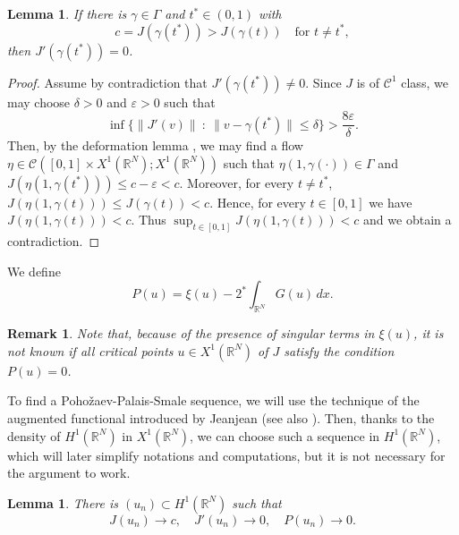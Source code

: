 \documentclass[12pt,leqno,twoside,sort]{amsart}
\newtheorem{Lem}[Th]{Lemma}
\newtheorem{Rem}[Th]{Remark}
\newcommand{\R}{\mathbb{R}}
\newcommand{\cC}{{\mathcal C}}
\numberwithin{equation}{section}
\begin{document}
\begin{Lem}\label{lemma:critical_point_on_path}
If there is $\gamma \in \Gamma$ and $t^*  \in (0,1)$ with 
$$
c = J(\gamma(t^*)) > J(\gamma(t)) \quad \mbox{for } t \neq t^*,
$$
then $J'(\gamma(t^*)) = 0$.
\end{Lem}

\begin{proof}
Assume by contradiction that $J'(\gamma(t^*)) \neq 0$. Since $J$ is of $\cC^1$ class, we may choose $\delta > 0$ and $\varepsilon > 0$ such that
$$
\inf \{ \| J'(v) \| \ : \ \|v - \gamma(t^*)\| \leq \delta \} > \frac{8\varepsilon}{\delta}.
$$
Then, by the deformation lemma \cite[Lemma 2.3]{W}, we may find a flow $\eta \in \cC ([0,1] \times X^1 (\R^N); X^1 (\R^N))$ such that $\eta(1, \gamma(\cdot)) \in \Gamma$ and $J(\eta(1,\gamma(t^*))) \leq c - \varepsilon < c$. Moreover, for every $t \neq t^*$, $J(\eta(1,\gamma(t))) \leq J(\gamma(t)) < c$. Hence, for every $t \in [0,1]$ we have $J(\eta(1,\gamma(t))) < c$. Thus $\sup_{t \in [0,1]} J(\eta(1,\gamma(t))) < c$ and we obtain a contradiction.
\end{proof}
We define
\[
    P(u) 
    = \xi(u) - 2^* \int_{\R^N} G(u) \, dx.
    \]

\begin{Rem}
    Note that, because of the presence of singular terms in $\xi(u)$, it is not known if all critical points $u\in X^1(\R^N)$ of $J$ satisfy the condition $P(u)=0$.
\end{Rem}




To find a Poho\v{z}aev-Palais-Smale sequence, we will use the technique of the augmented functional introduced by Jeanjean \cite{Jeanjean} (see also \cite{HirataIkomaTanaka, JeanjeanTanaka}). Then, thanks to the density of $H^1 (\R^N)$ in $X^1(\R^N)$, we can choose such a sequence in $H^1(\R^N)$, which will later simplify notations and computations, but it is not necessary for the argument to work.


\begin{Lem}\label{Lem:ExistencePPS}
There is $(u_n) \subset H^1 (\R^N)$ such that
$$
J(u_n) \to c, \quad J'(u_n) \to 0, \quad P(u_n) \to 0.
$$
\end{Lem}
\end{document}
